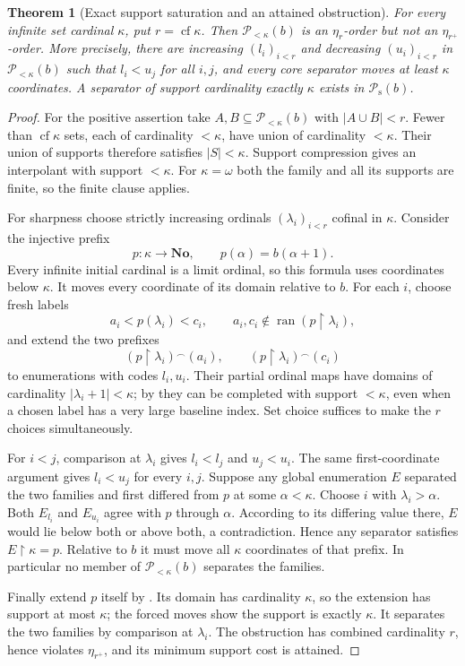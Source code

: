 \documentclass[11pt]{article}
\newtheorem{theorem}{Theorem}[section]
\theoremstyle{definition}
\theoremstyle{remark}
\newcommand{\No}{\mathbf{No}}
\newcommand{\Psupp}{\mathcal P_{\mathrm{s}}}
\newcommand{\ran}{\operatorname{ran}}
\newcommand{\cf}{\operatorname{cf}}
\newcommand{\cat}{\mathbin{{}^\frown}}
\newcommand{\res}{\mathbin{\upharpoonright}}
\begin{document}
\begin{theorem}[Exact support saturation and an attained obstruction]
\label{swo:tc:thm:support}
For every infinite set cardinal $\kappa$, put $r=\cf\kappa$.
Then $\mathcal P_{<\kappa}(b)$ is an $\eta_r$-order but not an
$\eta_{r^+}$-order. More precisely, there are increasing
$(l_i)_{i<r}$ and decreasing $(u_i)_{i<r}$ in $\mathcal P_{<\kappa}(b)$ such that
$l_i<u_j$ for all $i,j$, and every core separator moves at least
$\kappa$ coordinates. A separator of support cardinality exactly
$\kappa$ exists in $\Psupp(b)$.
\end{theorem}
\begin{proof}
For the positive assertion take $A,B\subseteq \mathcal P_{<\kappa}(b)$ with
$|A\cup B|<r$. Fewer than $\cf\kappa$ sets, each of cardinality
$<\kappa$, have union of cardinality $<\kappa$. Their union of
supports therefore satisfies $|S|<\kappa$. Support compression gives
an interpolant with support $<\kappa$. For $\kappa=\omega$ both the
family and all its supports are finite, so the finite clause applies.

For sharpness choose strictly increasing ordinals
$(\lambda_i)_{i<r}$ cofinal in $\kappa$. Consider the injective
prefix
\[
 p:\kappa\to\No,\qquad p(\alpha)=b(\alpha+1).
\]
Every infinite initial cardinal is a limit ordinal, so this formula
uses coordinates below $\kappa$. It moves every coordinate of its
domain relative to $b$.
For each $i$, choose fresh labels
\[
 a_i<p(\lambda_i)<c_i,
 \qquad a_i,c_i\notin\ran(p\res\lambda_i),
\]
and extend the two prefixes
\[
 (p\res\lambda_i)\cat(a_i),\qquad
 (p\res\lambda_i)\cat(c_i)
\]
to enumerations with codes $l_i,u_i$. Their partial ordinal maps have
domains of cardinality $|\lambda_i+1|<\kappa$; by
 they can be completed with support
$<\kappa$, even when a chosen label has a very large baseline index.
Set choice suffices to make the $r$ choices simultaneously.

For $i<j$, comparison at $\lambda_i$ gives $l_i<l_j$ and $u_j<u_i$.
The same first-coordinate argument gives $l_i<u_j$ for every $i,j$.
Suppose any global enumeration $E$ separated the two families and
first differed from $p$ at some $\alpha<\kappa$. Choose $i$ with
$\lambda_i>\alpha$. Both $E_{l_i}$ and $E_{u_i}$ agree with $p$
through $\alpha$. According to its differing value there, $E$ would
lie below both or above both, a contradiction. Hence any separator
satisfies $E\res\kappa=p$. Relative to $b$ it must move all
$\kappa$ coordinates of that prefix. In particular no member of
$\mathcal P_{<\kappa}(b)$ separates the families.

Finally extend $p$ itself by .
Its domain has cardinality $\kappa$, so the extension has support at
most $\kappa$; the forced moves show the support is exactly
$\kappa$. It separates the two families by comparison at
$\lambda_i$. The obstruction has combined cardinality $r$, hence
violates $\eta_{r^+}$, and its minimum support cost is attained.
\end{proof}
\end{document}
